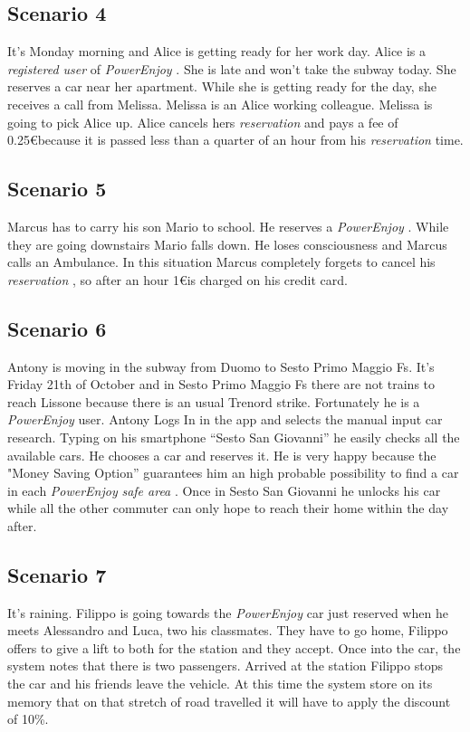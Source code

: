 \documentclass[english]{article}
\newcommand{\powerenjoy}{\textit{PowerEnjoy }}
\newcommand{\registereduser}{\textit {registered user }}
\newcommand{\safearea}{\textit{safe area }}
\newcommand{\reservation}{\textit{reservation }}
\begin{document}
		
	\subsection{Scenario 4}
		It's Monday morning and Alice is getting ready for her work day. Alice is a \registereduser of \powerenjoy . She is late and won't take the subway today. She reserves a car near her apartment. While she is getting ready for the day, she receives a call from Melissa. Melissa is an Alice working colleague. Melissa is going to pick Alice up. Alice cancels hers \reservation and pays a fee of 0.25\euro because it is passed less than a quarter of an hour from his \reservation time.
	\subsection{Scenario 5}
		Marcus has to carry his son Mario to school. He reserves a \powerenjoy. While they are going downstairs Mario falls down. He loses consciousness and Marcus calls an Ambulance. In this situation Marcus completely forgets to cancel his \reservation, so after an hour 1\euro is charged	on his credit card.
	\subsection{Scenario 6}
		Antony is moving in the subway from Duomo to Sesto Primo Maggio Fs. It's Friday 21th of October and in Sesto Primo Maggio Fs there are not trains to reach Lissone because there is an usual Trenord strike. Fortunately he is a \powerenjoy user. Antony Logs In in the app and selects the manual input car research. Typing on his smartphone ``Sesto San Giovanni'' he easily checks all the available  cars. He chooses a car and reserves it. He is very happy because the "Money Saving Option'' guarantees him an high probable possibility to find a car in each \powerenjoy \safearea. Once in Sesto San Giovanni he unlocks his car while all the other commuter can only hope to reach their home within the day after.
	\subsection{Scenario 7}
		It's raining. Filippo is going towards the \powerenjoy car just reserved when he meets Alessandro and Luca, two his classmates. They have to go home, Filippo offers to give a lift to both for the station and they accept. Once into the car, the system notes that there is two passengers. Arrived at the station Filippo stops the car and his friends leave the vehicle. At this time the system store on its memory that on that stretch of road travelled it will have to apply the discount of 10\%.
\end{document}
